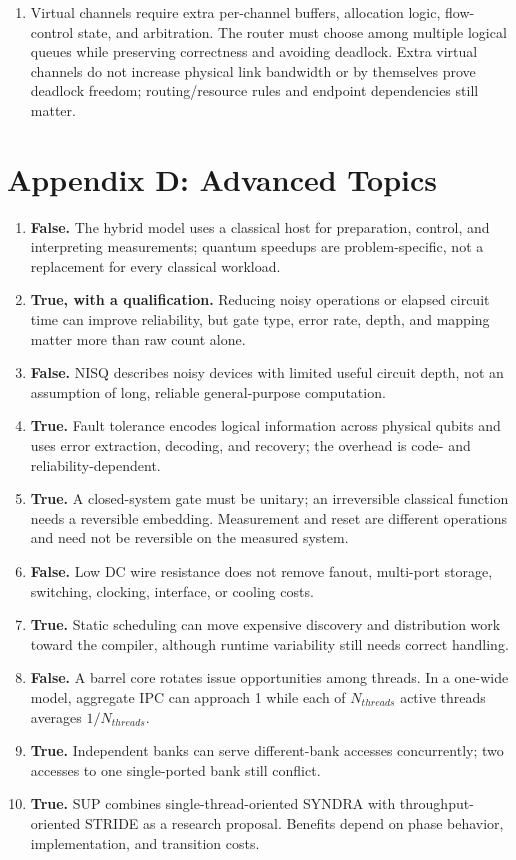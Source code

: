 \documentclass[11pt]{article}
\begin{document}
\begin{enumerate}
    \item Virtual channels require extra per-channel buffers, allocation logic, flow-control state, and arbitration.
    The router must choose among multiple logical queues while preserving correctness and avoiding deadlock.
    Extra virtual channels do not increase physical link bandwidth or by themselves prove deadlock freedom; routing/resource rules and endpoint dependencies still matter.
\end{enumerate}

\section{Appendix D: Advanced Topics}
\begin{enumerate}
    \item \textbf{False.} The hybrid model uses a classical host for preparation, control, and interpreting measurements; quantum speedups are problem-specific, not a replacement for every classical workload.
    \item \textbf{True, with a qualification.} Reducing noisy operations or elapsed circuit time can improve reliability, but gate type, error rate, depth, and mapping matter more than raw count alone.
    \item \textbf{False.} NISQ describes noisy devices with limited useful circuit depth, not an assumption of long, reliable general-purpose computation.
    \item \textbf{True.} Fault tolerance encodes logical information across physical qubits and uses error extraction, decoding, and recovery; the overhead is code- and reliability-dependent.
    \item \textbf{True.} A closed-system gate must be unitary; an irreversible classical function needs a reversible embedding. Measurement and reset are different operations and need not be reversible on the measured system.
    \item \textbf{False.} Low DC wire resistance does not remove fanout, multi-port storage, switching, clocking, interface, or cooling costs.
    \item \textbf{True.} Static scheduling can move expensive discovery and distribution work toward the compiler, although runtime variability still needs correct handling.
    \item \textbf{False.} A barrel core rotates issue opportunities among threads. In a one-wide model, aggregate IPC can approach 1 while each of $N_{threads}$ active threads averages $1/N_{threads}$.
    \item \textbf{True.} Independent banks can serve different-bank accesses concurrently; two accesses to one single-ported bank still conflict.
    \item \textbf{True.} SUP combines single-thread-oriented SYNDRA with throughput-oriented STRIDE as a research proposal. Benefits depend on phase behavior, implementation, and transition costs.
\end{enumerate}
\end{document}

